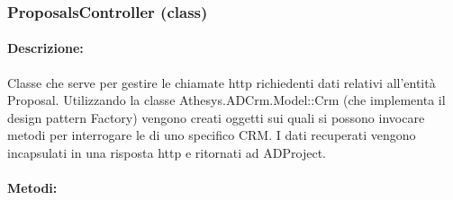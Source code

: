 \subsubsection{ProposalsController (class)}

\paragraph{Descrizione:}
Classe che serve per gestire le chiamate \gls{http} richiedenti dati relativi all'entità Proposal. Utilizzando la classe Athesys.ADCrm.Model::Crm (che implementa il design pattern Factory) vengono creati oggetti sui quali si possono invocare metodi per interrogare le  di uno specifico CRM. I dati recuperati vengono incapsulati in una risposta \gls{http} e ritornati ad ADProject.

\paragraph{Metodi:}\hfill
